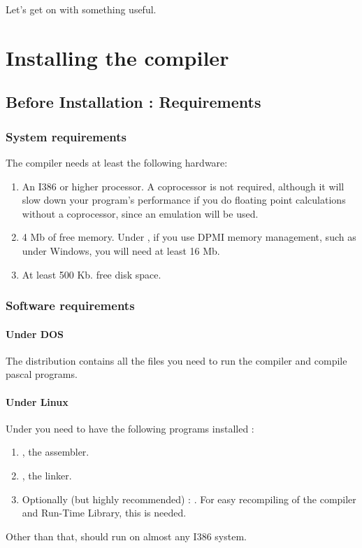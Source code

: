 \documentclass{report}
\begin{document}
Let's get on with something useful.


\chapter{Installing the compiler}
\label{ch:Installation}

\section{Before Installation : Requirements}

%
%
\subsection{System requirements}
The compiler needs at least the following hardware:
\begin{enumerate}
\item An I386 or higher processor. A coprocessor is not required, although it
will slow down your program's performance if you do floating point calculations
without a coprocessor, since an emulation will be used.
\item 4 Mb of free memory. Under \dos, if you use DPMI memory management,
such as under Windows, you will need at least 16 Mb.
\item At least 500 Kb. free disk space.
\end{enumerate}

\subsection{Software requirements}

\subsubsection{Under DOS}
The \dos distribution contains all the files you need to run the compiler
and compile pascal programs.

\subsubsection{Under Linux}
Under \linux you need to have the following programs installed :
\begin{enumerate}
\item \gnu {}, the \gnu assembler.
\item \gnu {}, the \gnu linker.
\item Optionally (but highly recommended) : \gnu {}. For easy
recompiling of the compiler and Run-Time Library, this is needed.
\end{enumerate}
Other than that, \fpc should run on almost any I386 \linux system.
\end{document}
